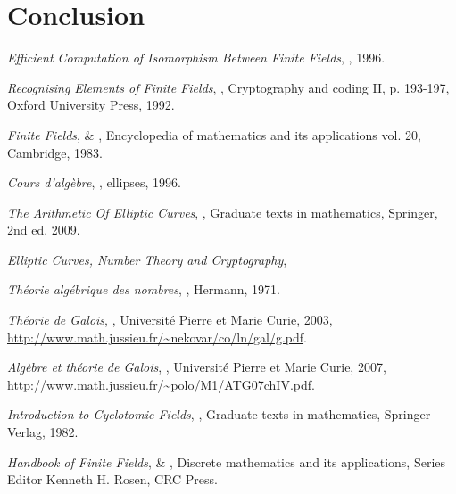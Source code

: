 \documentclass[a4paper]{article} %
\numberwithin{section}{part}
\numberwithin{equation}{section}
\begin{document}
\part{Conclusion}

\begin{thebibliography}{LC}

 \emph{Efficient Computation of Isomorphism Between Finite Fields},
, 1996.

 \emph{Recognising Elements of Finite Fields}, , Cryptography and coding II, p. 193-197, Oxford University Press, 1992.

 \emph{Finite Fields},  \& 
, Encyclopedia of mathematics and its applications vol.
20, Cambridge, 1983.

 \emph{Cours d'algèbre}, , ellipses, 1996.

 \emph{The Arithmetic Of Elliptic Curves}, 
, Graduate texts in mathematics, Springer, 2nd ed. 
2009.

 \emph{Elliptic Curves, Number Theory and Cryptography},


 \emph{Théorie algébrique des nombres}, , 
Hermann, 1971.


 \emph{Théorie de Galois}, , Université 
Pierre et Marie Curie, 2003,  
\url{http://www.math.jussieu.fr/~nekovar/co/ln/gal/g.pdf}.


 \emph{Algèbre et théorie de Galois}, , 
Université Pierre et Marie Curie, 2007,  
\url{http://www.math.jussieu.fr/~polo/M1/ATG07chIV.pdf}.

 \emph{Introduction to Cyclotomic Fields}, , Graduate texts in mathematics, Springer-Verlag, 1982.


 \emph{Handbook of Finite Fields},  \& 
, Discrete mathematics and its applications, Series Editor 
Kenneth H. Rosen, CRC Press.


\end{thebibliography}
\end{document}
